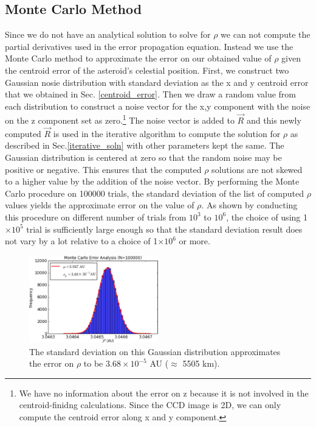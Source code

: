 \documentclass[authoryear, 12pt,5p, times]{elsarticle}
\begin{document}
\subsection{Monte Carlo Method}
\label{monte_carlo}
Since we do not have an analytical solution to solve for $\rho$ we can not compute the partial derivatives used in the error propagation equation. Instead we use the Monte Carlo method to approximate the error on our obtained value of $\rho$ given the centroid error of the asteroid's celestial position. First, we construct two Gaussian nosie distribution with standard deviation as the x and y centroid error that we obtained in Sec. \ref{centroid_error}. Then we draw a random value from each distribution to construct a noise vector for the x,y component with the noise on the z component set as zero.\footnote{ We have no information about the error on z  because it is not involved in the centroid-finidng calculations. Since the CCD image is 2D, we can only compute the centroid error along x and y component.}  The noise vector is added to $\vec{R}$ and this newly computed $\vec{R}$ is used in the iterative algorithm to compute the solution for $\rho$ as described in Sec.\ref{iterative_soln} with other parameters kept the same. The Gaussian distribution is centered at zero so that the random noise may be positive or negative. This ensures that the computed $\rho$ solutions are not skewed to  a higher value by the addition of the noise vector. By performing the Monte Carlo procedure on 100000 trials, the standard deviation of the list of computed $\rho$ values yields the approximate error on the value of $\rho$. As shown by conducting this procedure on different number of trials from $10^3$ to $10^6$, the choice of using 1$\times10^5$ trial is sufficiently large enough so that the standard deviation result does not vary by a lot relative to a choice of 1$\times10^6$ or more.
    	\begin{figure}[h!]
\includegraphics[width=0.5\textwidth]{figures/monte_carlo_result}
\caption{The standard deviation on this Gaussian distribution approximates the error on $\rho$ to be $3.68\times10^{-5}$ AU ($\approx$ 5505 km).}
\label{monte_carlo_result}
\end{figure}
\end{document}
